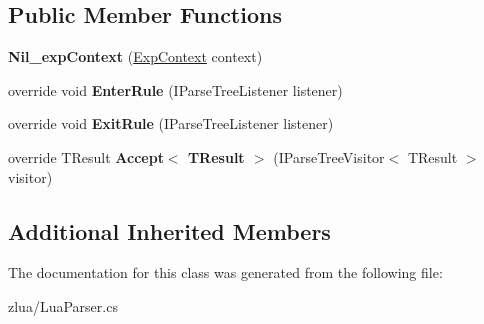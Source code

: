 \subsection*{Public Member Functions}
\begin{DoxyCompactItemize}
\item 
\mbox{\label{classzlua_1_1_lua_parser_1_1_nil__exp_context_a0a1ccac7bfec9774b94eaee7954863c4}} 
{\bfseries Nil\+\_\+exp\+Context} (\mbox{\hyperlink{classzlua_1_1_lua_parser_1_1_exp_context}{Exp\+Context}} context)
\item 
\mbox{\label{classzlua_1_1_lua_parser_1_1_nil__exp_context_ac3986d06c4939ae91b795aefeec7f185}} 
override void {\bfseries Enter\+Rule} (I\+Parse\+Tree\+Listener listener)
\item 
\mbox{\label{classzlua_1_1_lua_parser_1_1_nil__exp_context_a21c33322cc8d0077f9d5bb6153dc02ea}} 
override void {\bfseries Exit\+Rule} (I\+Parse\+Tree\+Listener listener)
\item 
\mbox{\label{classzlua_1_1_lua_parser_1_1_nil__exp_context_ad0bd4090dc8cd30e9c82c3f2658fe91d}} 
override T\+Result {\bfseries Accept$<$ T\+Result $>$} (I\+Parse\+Tree\+Visitor$<$ T\+Result $>$ visitor)
\end{DoxyCompactItemize}
\subsection*{Additional Inherited Members}


The documentation for this class was generated from the following file\+:\begin{DoxyCompactItemize}
\item 
zlua/Lua\+Parser.\+cs\end{DoxyCompactItemize}
